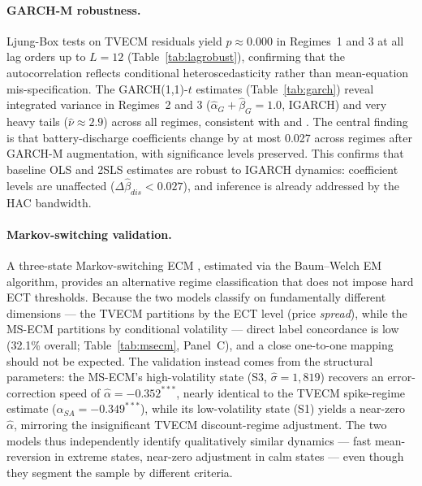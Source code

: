 \documentclass[12pt,a4paper]{article}
\begin{document}
\paragraph{GARCH-M robustness.}
Ljung-Box tests on TVECM residuals yield $p \approx 0.000$ in Regimes~1 and 3
at all lag orders up to $L = 12$ (Table~\ref{tab:lagrobust}), confirming that
the autocorrelation reflects conditional heteroscedasticity rather than
mean-equation mis-specification.  The GARCH(1,1)-$t$ estimates
(Table~\ref{tab:garch}) reveal integrated variance in Regimes~2 and 3
($\hat\alpha_G + \hat\beta_G = 1.0$, IGARCH) and very heavy tails
($\hat\nu \approx 2.9$) across all regimes, consistent with
\textcite{weron2006modeling} and \textcite{escribano2011modelling}.  The central
finding is that battery-discharge coefficients change by at most 0.027 across
regimes after GARCH-M augmentation, with significance levels preserved.  This
confirms that baseline OLS and 2SLS estimates are robust to IGARCH dynamics:
coefficient levels are unaffected ($\Delta\hat\beta_{dis} < 0.027$), and
inference is already addressed by the HAC bandwidth.

\paragraph{Markov-switching validation.}
A three-state Markov-switching ECM \parencite{hamilton1989new}, estimated via
the Baum--Welch EM algorithm, provides an alternative regime classification
that does not impose hard ECT thresholds.  Because the two models classify on
fundamentally different dimensions --- the TVECM partitions by the ECT level
(price \textit{spread}), while the MS-ECM partitions by conditional volatility
--- direct label concordance is low (32.1\% overall;
Table~\ref{tab:msecm}, Panel~C), and a close one-to-one mapping should not be
expected.  The validation instead comes from the structural parameters: the
MS-ECM's high-volatility state (S3, $\hat\sigma = 1{,}819$) recovers an
error-correction speed of $\hat\alpha = -0.352^{***}$, nearly identical to the
TVECM spike-regime estimate ($\hat\alpha_{SA} = -0.349^{***}$), while its
low-volatility state (S1) yields a near-zero $\hat\alpha$, mirroring the
insignificant TVECM discount-regime adjustment.  The two models thus
independently identify qualitatively similar dynamics --- fast mean-reversion
in extreme states, near-zero adjustment in calm states --- even though they
segment the sample by different criteria.
\end{document}
